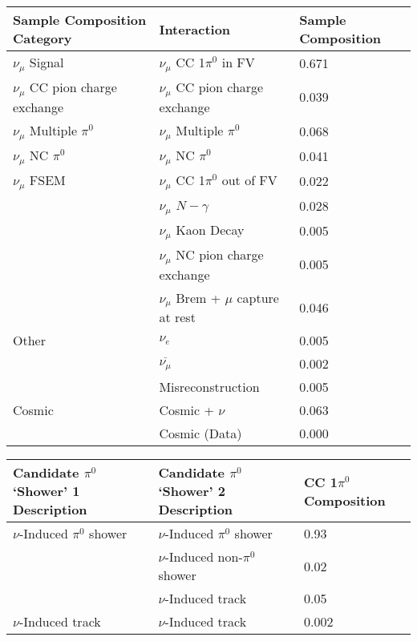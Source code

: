 \documentclass{article}
\begin{document}
\begin{table}[H]
\centering
{}
 \begin{tabular}{|l|l|l|}
 \hline
Sample Composition Category & Interaction & Sample Composition \\ [0.1ex] \hline
$\nu_\mu$ Signal & $\nu_\mu$ CC 1$\pi^0$ in FV & 0.671 \\ \hline
$\nu_\mu$ CC pion charge exchange & $\nu_\mu$ CC pion charge exchange & 0.039 \\ \hline
$\nu_\mu$ Multiple $\pi^0$ & $\nu_\mu$ Multiple $\pi^0$ & 0.068 \\ \hline
$\nu_\mu$ NC $\pi^0$ & $\nu_\mu$ NC $\pi^0$ & 0.041 \\ \hline
$\nu_\mu$ FSEM & $\nu_\mu$ CC 1$\pi^0$ out of FV & 0.022 \\
& $\nu_\mu$ $N-\gamma$ & 0.028 \\
& $\nu_\mu$ Kaon Decay & 0.005 \\
& $\nu_\mu$ NC pion charge exchange & 0.005 \\ 
&$\nu_\mu$ Brem + $\mu$ capture at rest & 0.046 \\ \hline
Other & $\nu_e$ &0.005 \\
&$\overline{\nu_\mu}$ & 0.002 \\
& Misreconstruction & 0.005 \\ \hline
Cosmic & Cosmic + $\nu$ & 0.063 \\
& Cosmic (Data) & 0.000 \\ \hline
\end{tabular}
\end{table}

\begin{table}[H]
\centering
{}
 \begin{tabular}{|l|l|l|}
 \hline
Candidate $\pi^0$ `Shower' 1 Description & Candidate $\pi^0$ `Shower' 2 Description & CC 1$\pi^0$ Composition \\ [0.1ex] \hline
$\nu$-Induced $\pi^0$ shower & $\nu$-Induced $\pi^0$ shower & 0.93 \\ 
& $\nu$-Induced non-$\pi^0$ shower & 0.02 \\ 
& $\nu$-Induced track & 0.05 \\ 
$\nu$-Induced track & $\nu$-Induced track & 0.002 \\ \hline
\end{tabular}
\end{table}
\end{document}
